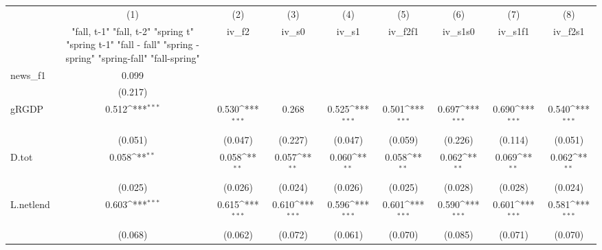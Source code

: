 {
\def\sym#1{\ifmmode^{#1}\else\(^{#1}\)\fi}
\begin{tabular}{l*{8}{c}}
\toprule
            &\multicolumn{1}{c}{(1)}&\multicolumn{1}{c}{(2)}&\multicolumn{1}{c}{(3)}&\multicolumn{1}{c}{(4)}&\multicolumn{1}{c}{(5)}&\multicolumn{1}{c}{(6)}&\multicolumn{1}{c}{(7)}&\multicolumn{1}{c}{(8)}\\
            &\multicolumn{1}{c}{  "fall, t-1" "fall, t-2" "spring t" "spring t-1"  "fall - fall" "spring - spring" "spring-fall" "fall-spring" }&\multicolumn{1}{c}{iv\_f2}&\multicolumn{1}{c}{iv\_s0}&\multicolumn{1}{c}{iv\_s1}&\multicolumn{1}{c}{iv\_f2f1}&\multicolumn{1}{c}{iv\_s1s0}&\multicolumn{1}{c}{iv\_s1f1}&\multicolumn{1}{c}{iv\_f2s1}\\
\midrule
news\_f1     &       0.099         &                     &                     &                     &                     &                     &                     &                     \\
            &     (0.217)         &                     &                     &                     &                     &                     &                     &                     \\
\addlinespace
gRGDP       &       0.512\sym{***}&       0.530\sym{***}&       0.268         &       0.525\sym{***}&       0.501\sym{***}&       0.697\sym{***}&       0.690\sym{***}&       0.540\sym{***}\\
            &     (0.051)         &     (0.047)         &     (0.227)         &     (0.047)         &     (0.059)         &     (0.226)         &     (0.114)         &     (0.051)         \\
\addlinespace
D.tot       &       0.058\sym{**} &       0.058\sym{**} &       0.057\sym{**} &       0.060\sym{**} &       0.058\sym{**} &       0.062\sym{**} &       0.069\sym{**} &       0.062\sym{**} \\
            &     (0.025)         &     (0.026)         &     (0.024)         &     (0.026)         &     (0.025)         &     (0.028)         &     (0.028)         &     (0.024)         \\
\addlinespace
L.netlend   &       0.603\sym{***}&       0.615\sym{***}&       0.610\sym{***}&       0.596\sym{***}&       0.601\sym{***}&       0.590\sym{***}&       0.601\sym{***}&       0.581\sym{***}\\
            &     (0.068)         &     (0.062)         &     (0.072)         &     (0.061)         &     (0.070)         &     (0.085)         &     (0.071)         &     (0.070)         \\

\end{tabular}}
